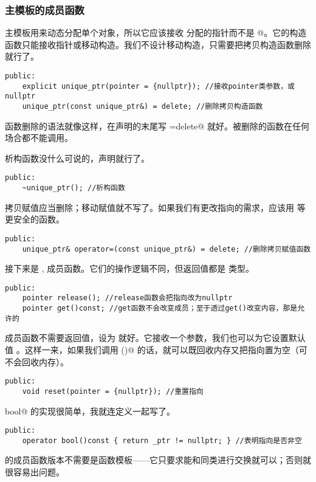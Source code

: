 \subsubsection*{主模板的成员函数}
主模板用来动态分配单个对象，所以它应该接收 \lstinline@new@ 分配的指针而不是 \lstinline@new[]@。它的构造函数只能接收指针或移动构造。我们不设计移动构造，只需要把拷贝构造函数删除就行了。
\begin{lstlisting}
public:
    explicit unique_ptr(pointer = {nullptr}); //接收pointer类参数，或nullptr
    unique_ptr(const unique_ptr&) = delete; //删除拷贝构造函数
\end{lstlisting}
函数删除的语法就像这样，在声明的末尾写 \lstinline@=delete@ 就好。被删除的函数在任何场合都不能调用。\par
析构函数没什么可说的，声明就行了。
\begin{lstlisting}
public:
    ~unique_ptr(); //析构函数
\end{lstlisting}\par
拷贝赋值应当删除；移动赋值就不写了。如果我们有更改指向的需求，应该用 \lstinline@reset@ 等更安全的函数。
\begin{lstlisting}
public:
    unique_ptr& operator=(const unique_ptr&) = delete; //删除拷贝赋值函数
\end{lstlisting}\par
接下来是 \lstinline@release@, \lstinline@get@ 成员函数。它们的操作逻辑不同，但返回值都是 \lstinline@pointer@ 类型。
\begin{lstlisting}
public:   
    pointer release(); //release函数会把指向改为nullptr
    pointer get()const; //get函数不会改变成员；至于透过get()改变内容，那是允许的
\end{lstlisting}\par
\lstinline@reset@ 成员函数不需要返回值，设为 \lstinline@void@ 就好。它接收一个参数，我们也可以为它设置默认值 \lstinline@nullptr@。这样一来，如果我们调用 \lstinline@reset()@ 的话，就可以既回收内存又把指向置为空（\lstinline@release@ 可不会回收内存）。
\begin{lstlisting}
public:
    void reset(pointer = {nullptr}); //重置指向
\end{lstlisting}\par
\lstinline@operator bool@ 的实现很简单，我就连定义一起写了。
\begin{lstlisting}
public:
    operator bool()const { return _ptr != nullptr; } //表明指向是否非空
\end{lstlisting}\par
\lstinline@swap@ 的成员函数版本不需要是函数模板——它只要求能和同类进行交换就可以；否则就很容易出问题。
